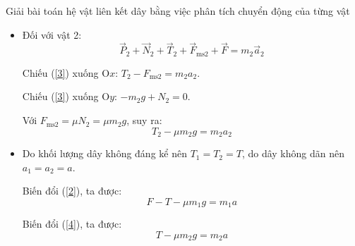 \begin{dang}{Giải bài toán hệ vật liên kết dây bằng việc phân tích chuyển động của từng vật}
{\begin{itemize}
		Chiếu (\ref{1}) xuống O$x$: $F - T_1 - F_\text{ms1} = m_1 a_1$.
		
		Chiếu (\ref{1}) xuống O$y$: $-m_1 g + N_1 = 0$.
		
		Với $F_\text{ms1} = \mu N_1 = \mu m_1 g$, suy ra:
		\begin{equation}\label{2}
			F-T_1 - \mu m_1 g = m_1 a_1
		\end{equation}
		\item Đối với vật 2:
		\begin{equation}\label{3}
			\vec P_2 + \vec N_2 + \vec T_2 + \vec F_\text{ms2} + \vec F = m_2 \vec a_2
		\end{equation}
		
		Chiếu (\ref{3}) xuống O$x$: $T_2 - F_\text{ms2} = m_2 a_2$.
		
		Chiếu (\ref{3}) xuống O$y$: $-m_2 g + N_2 = 0$.
		
		Với $F_\text{ms2} = \mu N_2 = \mu m_2 g$, suy ra:
		\begin{equation}\label{4}
			T_2 - \mu m_2 g = m_2 a_2
		\end{equation}
		
		\item Do khối lượng dây không đáng kể nên $T_1 = T_2 = T$, do dây không dãn nên $a_1 = a_2 = a$.
		
		Biến đổi (\ref{2}), ta được:
		\begin{equation}\label{5}
			F - T - \mu m_1 g = m_1 a
		\end{equation}
		
		Biến đổi (\ref{4}), ta được:
		\begin{equation}\label{6}
			T - \mu m_2 g= m_2 a
		\end{equation}
		

\end{itemize}}
\end{dang}
